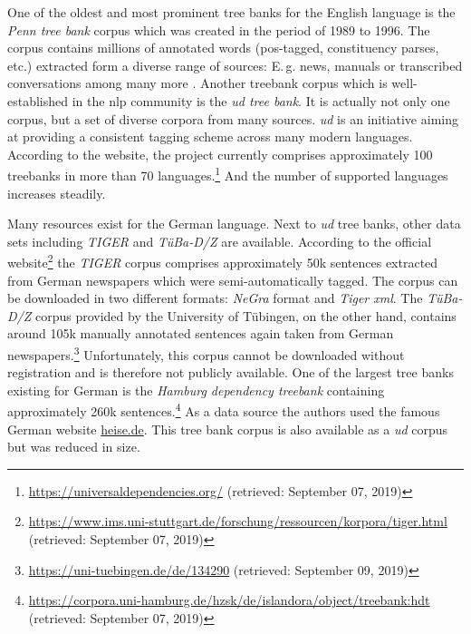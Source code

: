  One of the oldest and most prominent tree banks for the English language is the \textit{Penn tree bank} corpus which was created in the period of 1989 to 1996. The corpus contains millions of annotated words (\gls{pos}-tagged, constituency parses, etc.) extracted form a diverse range of sources: E.\,g. news, manuals or transcribed conversations among many more \citep{Taylor.2003}. Another treebank corpus which is well-established in the \gls{nlp} community is the \textit{\gls{ud} tree bank}. It is actually not only one corpus, but a set of diverse corpora from many sources. \textit{\gls{ud}} is an initiative aiming at providing a consistent tagging scheme across many modern languages. According to the website, the project currently comprises approximately 100 treebanks in more than 70 languages.\footnote{\url{https://universaldependencies.org/} (retrieved: September 07, 2019)} And the number of supported languages increases steadily.

 Many resources exist for the German language. Next to \textit{\gls{ud}} tree banks, other data sets including \textit{TIGER} and \textit{TüBa-D/Z} are available. According to the official website\footnote{\url{https://www.ims.uni-stuttgart.de/forschung/ressourcen/korpora/tiger.html} (retrieved: September 07, 2019)} the \textit{TIGER} corpus comprises approximately 50k sentences extracted from German newspapers which were semi-automatically tagged. The corpus can be downloaded in two different formats: \textit{NeGra} format and \textit{Tiger \gls{xml}}. The \textit{TüBa-D/Z} corpus provided by the University of Tübingen, on the other hand, contains around 105k manually annotated sentences again taken from German newspapers.\footnote{\url{https://uni-tuebingen.de/de/134290} (retrieved: September 09, 2019)} Unfortunately, this corpus cannot be downloaded without registration and is therefore not publicly available. One of the largest tree banks existing for German is the \textit{Hamburg dependency treebank} containing approximately 260k sentences.\footnote{\url{https://corpora.uni-hamburg.de/hzsk/de/islandora/object/treebank:hdt} (retrieved: September 07, 2019)} As a data source the authors used the famous German website \url{heise.de}. This tree bank corpus is also available as a \textit{\gls{ud}} corpus but was  reduced in size.

